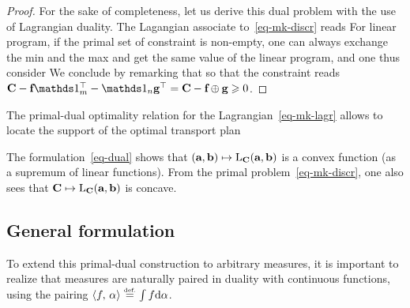 \begin{proof}
%
For the sake of completeness, let us derive this dual problem with the use of Lagrangian duality. The Lagangian associate to~\eqref{eq-mk-discr} reads
For linear program, if the primal set of constraint is non-empty, one can always exchange the min and the max and get the same value of the linear program, and one thus consider
We conclude by remarking that 
so that the constraint reads $\C - \fD\ones_m^\top - \ones_n \gD^\top = \C-\fD\oplus \gD \geq 0$.
\end{proof}

The primal-dual optimality relation for the Lagrangian~\eqref{eq-mk-lagr} allows to locate the support of the optimal transport plan

The formulation~\eqref{eq-dual} shows that $(\mathrm{\textbf{\upshape a}},\mathrm{\textbf{\upshape b}}) \mapsto \mathrm{L}_{\mathrm{\textbf{\upshape C}}}(\mathrm{\textbf{\upshape a}},\mathrm{\textbf{\upshape b}})$ is a convex function (as a supremum of linear functions). From the primal problem~\eqref{eq-mk-discr}, one also sees that $\mathrm{\textbf{\upshape C}} \mapsto \mathrm{L}_{\mathrm{\textbf{\upshape C}}}(\mathrm{\textbf{\upshape a}},\mathrm{\textbf{\upshape b}})$ is concave. 


  
\subsection{General formulation}

To extend this primal-dual construction to arbitrary measures, it is important to realize that measures are naturally paired in duality with continuous functions, using the pairing $\langle f,\,\alpha\rangle \stackrel{\mbox{\upshape\tiny def.}}{=} \int f \mathrm{d} \alpha$.

